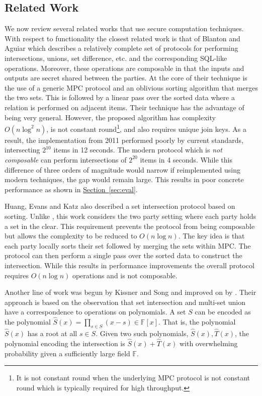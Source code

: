 \documentclass[11pt,letterpaper]{article}
\newcommand{\namedref}[2]{\hyperref[#2]{#1~\ref*{#2}}}
\newcommand{\sectionref}[1]{\namedref{Section}{#1}}
\begin{document}
\subsection{Related Work}
We now review several related works that use secure computation techniques. With respect to functionality the closest related work is that of Blanton and Aguiar\cite{ASIACCS:BlaAgu12} which describes a relatively complete set of protocols for performing intersections, unions, set difference, etc. and the corresponding SQL-like operations. Moreover, these operations are composable in that the inputs and outputs are secret shared between the parties. At the core of their technique is the use of a generic MPC protocol and an oblivious sorting algorithm that merges the two sets. This is followed by a linear pass over the sorted data where a relation is performed on adjacent items. Their technique has the advantage of being very general. However, the proposed algorithm has complexity $O(n \log^2 n)$, is not constant round\footnote{It is not constant round when the underlying MPC protocol is not constant round which is typically required for high throughput.},  and also requires unique join keys. 
\iffullversion
As a result, the implementation from 2011 performed poorly by current standards, intersecting $2^{10}$ items in 12 seconds. The modern protocol \cite{CCS:KKRT16} which is \emph{not composable} can perform intersections of $2^{20}$ items in 4 seconds. While this difference of three orders of magnitude would narrow if reimplemented using modern techniques, the gap would remain large.
\else
This results in poor concrete performance as shown in \sectionref{sec:eval}.
\fi


\iffullversion
Huang, Evans and Katz\cite{HEK12} also described a set intersection protocol based on sorting. Unlike \cite{ASIACCS:BlaAgu12}, this work considers the two party setting where each party holds a set in the clear.
This requirement prevents the protocol from being composable but allows the complexity to be reduced to $O(n\log n)$. The key idea is that each party locally sorts their set followed by merging the sets within MPC. The protocol can then perform a single pass over the sorted data to construct the intersection. While this results in performance improvements the overall protocol requires  $O(n\log n)$ operations and is not composable.
\fi

\iffullversion
Another line of work was begun by Kissner and Song\cite{KS06} and improved on by \cite{MF06}. Their approach is based on the observation that set intersection and multi-set union have a correspondence to operations on polynomials. A set $S$ can be encoded as the polynomial $\hat S(x)= \prod_{s\in S}(x-s)\in \mathbb{F}[x]$. That is, the polynomial $\hat S(x)$ has a root at all $s\in S$. Given two such polynomials, $\hat S(x), \hat T(x)$, the polynomial encoding the intersection is $\hat S(x)+\hat T(x)$ with overwhelming probability given a sufficiently large field $\mathbb{F}$.
\end{document}
